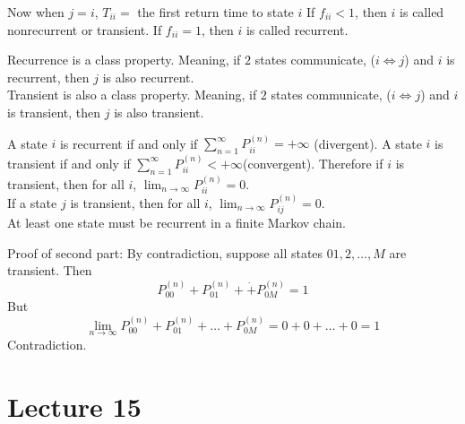 \documentclass[12pt]{article}
\begin{document}
Now when $j = i$, $T_{ii} = $ the first return time to state $i$ If $f_{ii} < 1$, then $i$ is called nonrecurrent or transient. If $f_{ii} = 1$, then $i$ is called recurrent. 
\begin{theorem} Recurrence is a class property. Meaning, if $2$ states communicate, ($i \iff j$) and $i$ is recurrent, then $j$ is also recurrent. \\
Transient is also a class property. Meaning, if $2$ states communicate, ($i \iff j$) and $i$ is transient, then $j$ is also transient. \end{theorem} 
\begin{theorem} A state $i$ is recurrent if and only if $\sum_{n=1}^\infty P_{ii}^{(n)} = +\infty$ (divergent). A state $i$ is transient if and only if $\sum_{n=1}^\infty P_{ii}^{(n)} < +\infty $(convergent). Therefore if $i$ is transient, then for all $i$, $\lim_{n\to \infty} P_{ii}^{(n)} = 0$. \\ If a state $j$ is transient, then for all $i$, $\lim_{n\to\infty} P_{ij}^{(n)} = 0$. \\ At least one state must be recurrent in a finite Markov chain. \end{theorem} 
Proof of second part: By contradiction, suppose all states $01,2,\dots,M$ are transient. Then $$P_{00}^{(n)} + P_{01}^{(n)} + \dot + P_{0M}^{(n)} = 1$$ But $$ \lim_{n\to\infty} P_{00}^{(n)} + P_{01}^{(n)} + \dots + P_{0M}^{(n)} = 0 + 0 + \dots + 0 = 1 $$ Contradiction. 

\section{Lecture 15}
\end{document}
